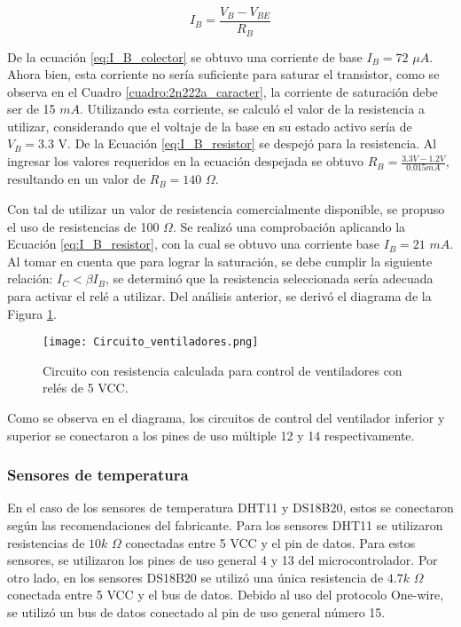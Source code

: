 \begin{equation}
	I_B = \frac{V_B-V_{BE}}{R_B}
	\label{eq:I_B_resistor}
\end{equation}

De la ecuación \ref{eq:I_B_colector} se obtuvo una corriente de base $I_B = 72$ $\mu A$. Ahora bien, esta corriente no sería suficiente para saturar el transistor, como se observa en el Cuadro \ref{cuadro:2n222a_caracter}, la corriente de saturación debe ser de 15 $mA$. Utilizando esta corriente, se calculó el valor de la resistencia a utilizar, considerando que el voltaje de la base en su estado activo sería de $V_{B} = 3.3$ V. De la Ecuación \ref{eq:I_B_resistor} se despejó para la resistencia. Al ingresar los valores requeridos en la ecuación despejada se obtuvo $R_B = \frac{3.3V-1.2V}{0.015mA}$, resultando en un valor de $R_B = 140$ $\Omega$.

Con tal de utilizar un valor de resistencia comercialmente disponible, se propuso el uso de resistencias de 100 $\Omega$. Se realizó una comprobación aplicando la Ecuación \ref{eq:I_B_resistor}, con la cual se obtuvo una corriente base $I_B = 21$ $mA$. Al tomar en cuenta que para lograr la saturación, se debe cumplir la siguiente relación: $I_C < \beta I_B$, se determinó que la resistencia seleccionada sería adecuada para activar el relé a utilizar. Del análisis anterior, se derivó el diagrama de la Figura \ref{fig:diag_rele}.

\begin{figure}[H]
	\centering
	\texttt{[image: Circuito\_ventiladores.png]}
	\caption{Circuito con resistencia calculada para control de ventiladores con relés de 5 VCC.}
	\label{fig:diag_rele}
\end{figure}

Como se observa en el diagrama, los circuitos de control del ventilador inferior y superior se conectaron a los pines de uso múltiple 12 y 14 respectivamente. 

\subsubsection{Sensores de temperatura}

En el caso de los sensores de temperatura DHT11 y DS18B20, estos se conectaron según las recomendaciones del fabricante. Para los sensores DHT11 se utilizaron resistencias de $10k$ $\Omega$ conectadas entre 5 VCC y el pin de datos. Para estos sensores, se utilizaron los pines de uso general 4 y 13 del microcontrolador. Por otro lado, en los sensores DS18B20 se utilizó una única resistencia de $4.7k$ $\Omega$ conectada entre 5 VCC y el bus de datos. Debido al uso del protocolo One-wire, se utilizó un bus de datos conectado al pin de uso general número 15.

